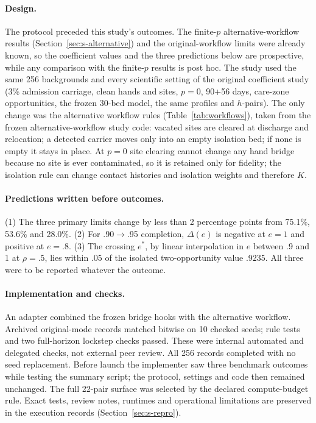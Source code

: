 \documentclass[11pt]{article}
\begin{document}
\paragraph{Design.} The protocol preceded this study's outcomes. The finite-$p$ alternative-workflow
results (Section~\ref{sec:s-alternative}) and the original-workflow limits were
already known, so the coefficient values and the three predictions below are
prospective, while any comparison with the finite-$p$ results is post hoc. The
study used the same 256 backgrounds and every scientific setting of the original
coefficient study (3\% admission carriage, clean hands and sites, $p=0$,
90+56 days, care-zone opportunities, the frozen 30-bed model, the same profiles
and $h$-pairs). The only change was the alternative workflow rules
(Table~\ref{tab:workflows}), taken from the frozen alternative-workflow study code: vacated
sites are cleared at discharge and relocation; a detected carrier moves only into
an empty isolation bed; if none is empty it stays in place. At $p=0$ site
clearing cannot change any hand bridge because no site is ever contaminated, so
it is retained only for fidelity; the isolation rule can change contact
histories and isolation weights and therefore $K$.

\paragraph{Predictions written before outcomes.} (1) The three primary limits
change by less than 2 percentage points from 75.1\%, 53.6\% and 28.0\%.
(2) For .90$\to$.95 completion, $\Delta(e)$ is negative at $e=1$ and positive at
$e=.8$. (3) The crossing $e^*$, by linear interpolation in $e$ between .9 and 1
at $\rho=.5$, lies within .05 of the isolated two-opportunity value .9235. All
three were to be reported whatever the outcome.

\paragraph{Implementation and checks.} An adapter combined the frozen bridge
hooks with the alternative workflow. Archived original-mode records matched
bitwise on 10 checked seeds; rule tests and two full-horizon lockstep checks
passed. These were internal automated and delegated checks, not external peer
review. All 256 records completed with no seed replacement. Before launch the
implementer saw three benchmark outcomes while testing the summary script;
the protocol, settings and code then remained unchanged. The full 22-pair
surface was selected by the declared compute-budget rule. Exact tests, review
notes, runtimes and operational limitations are preserved in the execution
records (Section~\ref{sec:s-repro}).
\end{document}
